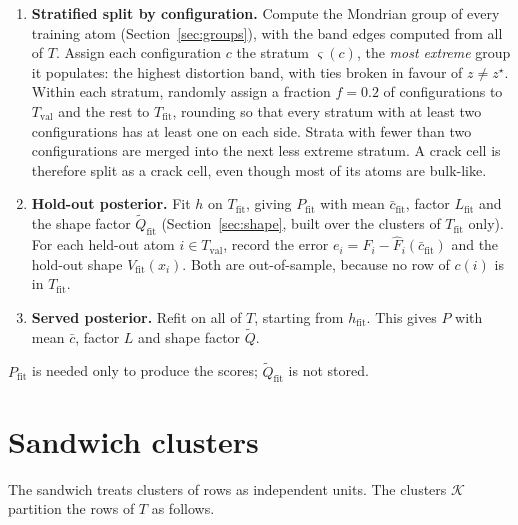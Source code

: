 \documentclass[11pt,a4paper]{article}
\newcommand{\Tfit}{T_{\mathrm{fit}}}
\newcommand{\Tval}{T_{\mathrm{val}}}
\newcommand{\cbar}{\bar{c}}
\newcommand{\cfit}{\bar{c}_{\mathrm{fit}}}
\newcommand{\Qt}{\tilde{Q}}
\begin{document}
\begin{enumerate}
\item \textbf{Stratified split by configuration.} Compute the Mondrian group of every training atom
(Section~\ref{sec:groups}), with the band edges computed from all of $T$. Assign each configuration $c$ the stratum
$\varsigma(c)$, the \emph{most extreme} group it populates: the highest distortion band, with ties
broken in favour of $z\ne z^\star$. Within each stratum, randomly assign a fraction $f=0.2$ of
configurations to $\Tval$ and the rest to $\Tfit$, rounding so that every stratum with at least two
configurations has at least one on each side. Strata with fewer than two configurations are merged
into the next less extreme stratum. A crack cell is therefore split as a crack cell, even though
most of its atoms are bulk-like.


\item \textbf{Hold-out posterior.} Fit $h$ on $\Tfit$, giving $P_{\mathrm{fit}}$ with mean
$\cfit$, factor $L_{\mathrm{fit}}$ and the shape factor $\Qt_{\mathrm{fit}}$ (Section~\ref{sec:shape},
built over the clusters of $\Tfit$ only). For each held-out atom $i\in\Tval$, record the error
$e_i=F_i-\hat F_i(\cfit)$ and the hold-out shape $V_{\mathrm{fit}}(x_i)$. Both are out-of-sample,
because no row of $c(i)$ is in $\Tfit$.

\item \textbf{Served posterior.} Refit on all of $T$, starting from $h_{\mathrm{fit}}$. This gives
$P$ with mean $\cbar$, factor $L$ and shape factor $\Qt$.
\end{enumerate}

$P_{\mathrm{fit}}$ is needed only to produce the scores; $\Qt_{\mathrm{fit}}$ is not stored.

\section{Sandwich clusters}\label{sec:clusters}

The sandwich treats clusters of rows as independent units. The clusters $\mathcal{K}$ partition
the rows of $T$ as follows.
\end{document}
